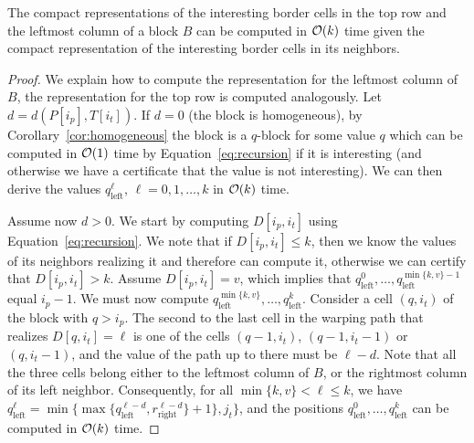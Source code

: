 \begin{lemma}\label{lm:top-left}
The compact representations of the interesting border cells in the top row and the leftmost column of a block $B$ can be computed in $\mathcal{O}(k)$ time given the compact representation of the interesting border cells in its neighbors.
\end{lemma}
\begin{proof}
We explain how to compute the representation for the leftmost column of $B$, the representation for the top row is computed analogously.  Let $d = d(P[i_p],T[i_t])$. If $d=0$ (the block is homogeneous), by Corollary~\ref{cor:homogeneous} the block is a $q$-block for some value $q$ which can be computed in $\mathcal{O}(1)$ time by Equation~\ref{eq:recursion} if it is interesting (and otherwise we have a certificate that the value is not interesting). We can then derive the values $q_{\text{left}}^\ell$, $\ell = 0, 1, \ldots, k$ in $\mathcal{O}(k)$ time.

Assume now $d > 0$. We start by computing $D[i_p,i_t]$ using Equation~\ref{eq:recursion}. We note that if $D[i_p,i_t] \le k$, then we know the values of its neighbors realizing it and therefore can compute it, otherwise we can certify that $D[i_p,i_t] > k$. Assume $D[i_p,i_t] = v$, which implies that $q_{\text{left}}^0, \ldots, q_{\text{left}}^{\min\{k,v\}-1}$ equal $i_p-1$. We must now compute $q_{\text{left}}^{\min\{k,v\}}, \ldots, q_{\text{left}}^{k}$. Consider a cell $(q,i_t)$ of the block with $q > i_p$.  The second to the last cell in the warping path that realizes $D[q,i_t] = \ell$ is one of the cells $(q-1,i_t)$, $(q-1,i_t-1)$ or $(q,i_t-1)$, and the value of the path up to there must be $\ell-d$. Note that all the three cells belong either to the leftmost column of $B$, or the rightmost column of its left neighbor. Consequently, for all $\min\{k,v\} < \ell \le k$, we have $q_{\text{left}}^\ell = \min\{\max\{q_{\text{left}}^{\ell-d}, r_{\text{right}}^{\ell-d}\} + 1\}, j_t\}$, and the positions $q_{\text{left}}^0, \ldots, q_{\text{left}}^{k}$ can be computed in $\mathcal{O}(k)$ time.
\end{proof}



